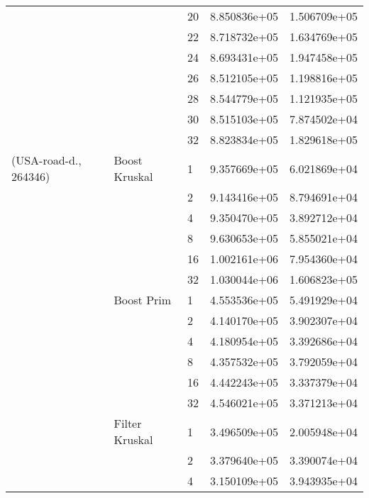 \begin{tabular}{lllrr}
                       &                    & 20 &  8.850836e+05 &  1.506709e+05 \\
                       &                    & 22 &  8.718732e+05 &  1.634769e+05 \\
                       &                    & 24 &  8.693431e+05 &  1.947458e+05 \\
                       &                    & 26 &  8.512105e+05 &  1.198816e+05 \\
                       &                    & 28 &  8.544779e+05 &  1.121935e+05 \\
                       &                    & 30 &  8.515103e+05 &  7.874502e+04 \\
                       &                    & 32 &  8.823834e+05 &  1.829618e+05 \\
(USA-road-d., 264346) & Boost Kruskal & 1  &  9.357669e+05 &  6.021869e+04 \\
                       &                    & 2  &  9.143416e+05 &  8.794691e+04 \\
                       &                    & 4  &  9.350470e+05 &  3.892712e+04 \\
                       &                    & 8  &  9.630653e+05 &  5.855021e+04 \\
                       &                    & 16 &  1.002161e+06 &  7.954360e+04 \\
                       &                    & 32 &  1.030044e+06 &  1.606823e+05 \\
                       & Boost Prim & 1  &  4.553536e+05 &  5.491929e+04 \\
                       &                    & 2  &  4.140170e+05 &  3.902307e+04 \\
                       &                    & 4  &  4.180954e+05 &  3.392686e+04 \\
                       &                    & 8  &  4.357532e+05 &  3.792059e+04 \\
                       &                    & 16 &  4.442243e+05 &  3.337379e+04 \\
                       &                    & 32 &  4.546021e+05 &  3.371213e+04 \\
                       & Filter Kruskal & 1  &  3.496509e+05 &  2.005948e+04 \\
                       &                    & 2  &  3.379640e+05 &  3.390074e+04 \\
                       &                    & 4  &  3.150109e+05 &  3.943935e+04 \\

\end{tabular}
